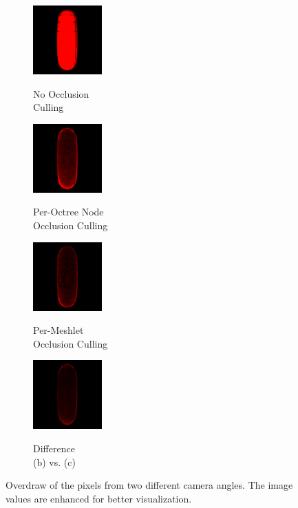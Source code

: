 \begin{figure}[!htb]
  \begin{subfigure}{100px}
    \includegraphics[height=100px]{images/graphics/overdraw-torus2-nocull.png}
    \caption{}
    \parbox{\linewidth}{\centering\footnotesize No Occlusion\\Culling}
  \end{subfigure}
  \begin{subfigure}{100px}
    \includegraphics[height=100px]{images/graphics/overdraw-torus2-pooc.png}
    \caption{}
    \parbox{\linewidth}{\centering\footnotesize Per-Octree Node\\Occlusion Culling}
  \end{subfigure}
  \begin{subfigure}{100px}
    \includegraphics[height=100px]{images/graphics/overdraw-torus2-pmoc.png}
    \caption{}
    \parbox{\linewidth}{\centering\footnotesize Per-Meshlet\\Occlusion Culling}
  \end{subfigure}
  \begin{subfigure}{100px}
    \includegraphics[height=100px]{images/graphics/overdraw-torus2-diff.png}
    \caption{}
    \parbox{\linewidth}{\centering\footnotesize Difference\\(b) vs. (c)}
  \end{subfigure}

  \caption{Overdraw of the pixels from two different camera angles. 
  The image values are enhanced for better visualization.}
  \label{fig:torus-overdraw}
\end{figure}

